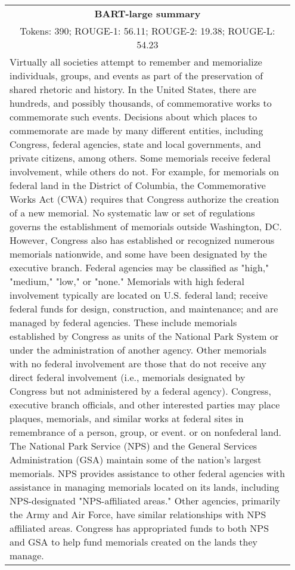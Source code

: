 \documentclass[11pt,table]{article}
\begin{document}
\begin{table*}[ht]
\begin{tabular}{p{0.95\linewidth}}
    \bottomrule
  \end{tabular}
  \caption{Sample abstract from the GovReport test set (ID = 681). Model predictions are presentend in the next pages.} \label{tab:abstract_sample_govreport}
\end{table*}


\begin{table*}[ht]
  \centering
  \begin{tabular}{p{0.95\linewidth}}
    \toprule
    \multicolumn{1}{c}{\textbf{BART-large summary}} \\
    \multicolumn{1}{c}{Tokens: 390; ROUGE-1: 56.11; ROUGE-2: 19.38; ROUGE-L: 54.23} \\
    \midrule
    Virtually all societies attempt to remember and memorialize individuals, groups, and events as part of the preservation of shared rhetoric and history. In the United States, there are hundreds, and possibly thousands, of commemorative works to commemorate such events. Decisions about which places to commemorate are made by many different entities, including Congress, federal agencies, state and local governments, and private citizens, among others. Some memorials receive federal involvement, while others do not. For example, for memorials on federal land in the District of Columbia, the Commemorative Works Act (CWA) requires that Congress authorize the creation of a new memorial. No systematic law or set of regulations governs the establishment of memorials outside Washington, DC. However, Congress also has established or recognized numerous memorials nationwide, and some have been designated by the executive branch. Federal agencies may be classified as "high," "medium," "low," or "none." Memorials with high federal involvement typically are located on U.S. federal land; receive federal funds for design, construction, and maintenance; and are managed by federal agencies. These include memorials established by Congress as units of the National Park System or under the administration of another agency. Other memorials with no federal involvement are those that do not receive any direct federal involvement (i.e., memorials designated by Congress but not administered by a federal agency). Congress, executive branch officials, and other interested parties may place plaques, memorials, and similar works at federal sites in remembrance of a person, group, or event. or on nonfederal land. The National Park Service (NPS) and the General Services Administration (GSA) maintain some of the nation's largest memorials. NPS provides assistance to other federal agencies with assistance in managing memorials located on its lands, including NPS-designated "NPS-affiliated areas." Other agencies, primarily the Army and Air Force, have similar relationships with NPS affiliated areas. Congress has appropriated funds to both NPS and GSA to help fund memorials created on the lands they manage.\\
    \bottomrule
  \end{tabular}
  \caption{Summary generated by BART for a document from GovReport test set (ID = 681). Reference summary is presented in Table \ref{tab:abstract_sample_govreport}.} \label{tab:summary_sample_govreport}
\end{table*}
\end{document}
